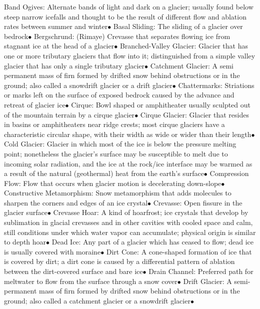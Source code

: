 \documentclass{article}
\newcommand{\ddd}{$\bullet$}
\begin{document}
\begin{multicols*}{4}
        Band Ogives: Alternate bands of light and dark on a glacier; usually found below steep narrow icefalls and thought to be the result of different flow and ablation rates between summer and winter\ddd
        Basal Sliding: The sliding of a glacier over bedrock\ddd
        Bergschrund: (Rimaye) Crevasse that separates flowing ice from stagnant ice at the head of a glacier\ddd
        Branched-Valley Glacier: Glacier that has one or more tributary glaciers that flow into it; distinguished from a simple valley glacier that has only a single tributary glacier\ddd
        Catchment Glacier: A semi permanent mass of firn formed by drifted snow behind obstructions or in the ground; also called a snowdrift glacier or a drift glacier\ddd
        Chattermarks: Striations or marks left on the surface of exposed bedrock caused by the advance and retreat of glacier ice\ddd
        Cirque: Bowl shaped or amphitheater usually sculpted out of the mountain terrain by a cirque glacier\ddd
        Cirque Glacier: Glacier that resides in basins or amphitheaters near ridge crests; most cirque glaciers have a characteristic circular shape, with their width as wide or wider than their length\ddd
        Cold Glacier: Glacier in which most of the ice is below the pressure melting point; nonetheless the glacier’s surface may be susceptible to melt due to incoming solar radiation, and the ice at the rock/ice interface may be warmed as a result of the natural (geothermal) heat from the earth’s surface\ddd
        Compression Flow: Flow that occurs when glacier motion is decelerating down-slope\ddd
        Constructive Metamorphism: Snow metamorphism that adds molecules to sharpen the corners and edges of an ice crystal\ddd
        Crevasse: Open fissure in the glacier surface\ddd
        Crevasse Hoar: A kind of hoarfrost; ice crystals that develop by sublimation in glacial crevasses and in other cavities with cooled space and calm, still conditions under which water vapor can accumulate; physical origin is similar to depth hoar\ddd
        Dead Ice: Any part of a glacier which has ceased to flow; dead ice is usually covered with moraine\ddd
        Dirt Cone: A cone-shaped formation of ice that is covered by dirt; a dirt cone is caused by a differential pattern of ablation between the dirt-covered surface and bare ice\ddd
        Drain Channel: Preferred path for meltwater to flow from the surface through a snow cover\ddd
        Drift Glacier: A semi-permanent mass of firn formed by drifted snow behind obstructions or in the ground; also called a catchment glacier or a snowdrift glacier\ddd

\end{multicols*}
\end{document}
